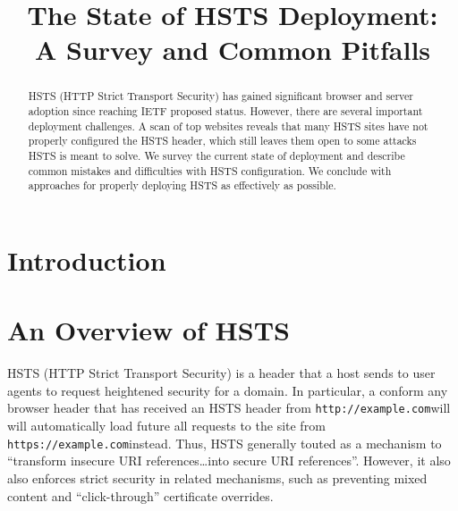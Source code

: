 \documentclass[conference]{./IEEEtran}
\newcommand{\site}[1]{\texttt{#1}}
\newcommand{\genericsite}{example.com}
\newcommand{\h}{{\site{http://\genericsite}}}
\newcommand{\s}{{\site{https://\genericsite}}}
\theoremstyle{plain}
\begin{document}
\title{The State of HSTS Deployment:\\A Survey and Common Pitfalls}

\author{}


\maketitle

\thispagestyle{fancy}

\begin{abstract}
HSTS (HTTP Strict Transport Security) has gained significant browser and server adoption since reaching IETF proposed status. However, there are several important deployment challenges. A scan of top websites reveals that many HSTS sites have not properly configured the HSTS header, which still leaves them open to some attacks HSTS is meant to solve. We survey the current state of deployment and describe common mistakes and difficulties with HSTS configuration. We conclude with approaches for properly deploying HSTS as effectively as possible.
\end{abstract}

\section{Introduction}
\label{sec:intro}

\section{An Overview of HSTS}

HSTS (HTTP Strict Transport Security) is a header that a host sends to user agents to request heightened security for a domain. In particular, a conform any browser header that has received an HSTS header from \h will will automatically load future all requests to the site from \s instead. Thus, HSTS generally touted as a mechanism to ``transform insecure URI references\ldots into secure URI references''. However, it also also enforces strict security in related mechanisms, such as preventing mixed content and ``click-through'' certificate overrides\cite{rfc}.
\end{document}
